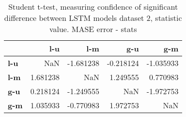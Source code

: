 \begin{table}[H]
\centering
\caption{Student t-test, measuring confidence of significant difference between LSTM models dataset 2, statistic value. MASE error - stats}
\label{table:ttest-stats-lstm-experiments-MASE-dataset-2}
\begin{tabular}{lrrrr}
\toprule
{} &       l-u &       l-m &       g-u &       g-m \\
\midrule
\textbf{l-u} &       NaN & -1.681238 & -0.218124 & -1.035933 \\
\textbf{l-m} &  1.681238 &       NaN &  1.249555 &  0.770983 \\
\textbf{g-u} &  0.218124 & -1.249555 &       NaN & -1.972753 \\
\textbf{g-m} &  1.035933 & -0.770983 &  1.972753 &       NaN \\
\bottomrule
\end{tabular}
\end{table}
